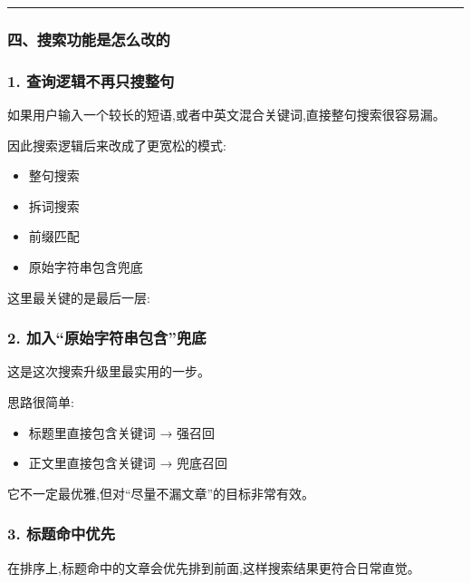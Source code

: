 \documentclass[lang=cn,scheme=chinese,color=blue,device=normal,toc=onecol,math=cm]{elegantbook}
\begin{document}
\medskip\hrule\medskip


\subsubsection{四、搜索功能是怎么改的}


\subsubsection{1. 查询逻辑不再只搜整句}


如果用户输入一个较长的短语,或者中英文混合关键词,直接整句搜索很容易漏。\par


因此搜索逻辑后来改成了更宽松的模式:\par


\begin{itemize}
\item 整句搜索
\item 拆词搜索
\item 前缀匹配
\item 原始字符串包含兜底
\end{itemize}


这里最关键的是最后一层:\par


\subsubsection{2. 加入“原始字符串包含”兜底}


这是这次搜索升级里最实用的一步。\par


思路很简单:\par


\begin{itemize}
\item 标题里直接包含关键词 → 强召回
\item 正文里直接包含关键词 → 兜底召回
\end{itemize}


它不一定最优雅,但对“尽量不漏文章”的目标非常有效。\par


\subsubsection{3. 标题命中优先}


在排序上,标题命中的文章会优先排到前面,这样搜索结果更符合日常直觉。\par
\end{document}
